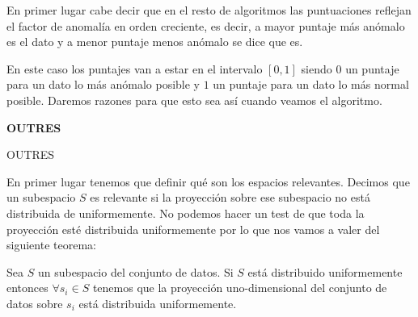 En primer lugar cabe decir que en el resto de algoritmos las puntuaciones reflejan el factor de anomalía en orden creciente, es decir, a mayor puntaje más anómalo es el dato y a menor puntaje menos anómalo se dice que es.

En este caso los puntajes van a estar en el intervalo $[0,1]$ siendo $0$ un puntaje para un dato lo más anómalo posible y $1$ un puntaje para un dato lo más normal posible. Daremos razones para que esto sea así cuando veamos el algoritmo.

\begin{algorithm}[H]{\textbf{OUTRES}}
	
	
	
	
	\caption{OUTRES}
	\label{outres}
\end{algorithm}

En primer lugar tenemos que definir qué son los espacios relevantes. Decimos que un subespacio $S$ es relevante si la proyección sobre ese subespacio no está distribuida de uniformemente. No podemos hacer un test de que toda la proyección esté distribuida uniformemente por lo que nos vamos a valer del siguiente teorema:

\begin{teorema}
	Sea $S$ un subespacio del conjunto de datos. Si $S$ está distribuido uniformemente entonces $\forall s_i \in S$ tenemos que la proyección uno-dimensional del conjunto de datos sobre $s_i$ está distribuida uniformemente.
\end{teorema}

